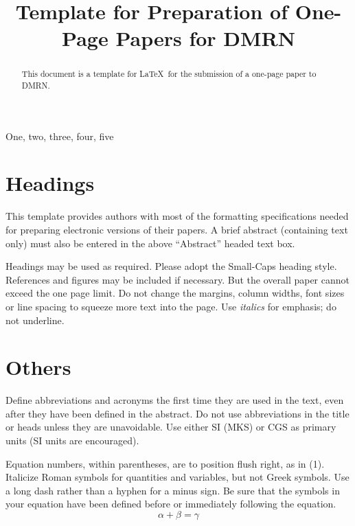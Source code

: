 \documentclass{article}
\title{Template for Preparation of One-Page Papers for DMRN}
\begin{document}
\tenpt
\maketitle

\begin{sloppy}
\begin{abstract}
This document is a template for \LaTeX\ for the submission of a one-page paper to DMRN. 
\end{abstract}

\begin{keywords}
One, two, three, four, five
\end{keywords}

\section{Headings}
\label{sec:headings}
This template provides authors with most of the formatting specifications needed for preparing electronic versions of their papers. A brief abstract (containing text only) must also be entered in the above ``Abstract'' headed text box.

Headings may be used as required. Please adopt the Small-Caps heading style. References and figures may be included if necessary. But the overall paper cannot exceed the one page limit. Do not change the margins, column widths, font sizes or line spacing to squeeze more text into the page. Use \textit{italics} for emphasis; do not underline. 

\section{Others}
\label{sec:others}
Define abbreviations and acronyms the first time they are used in the text, even after they have been defined in the abstract. Do not use abbreviations in the title or heads unless they are unavoidable. Use either SI (MKS) or CGS as primary units (SI units are encouraged).

Equation numbers, within parentheses, are to position flush right, as in (1). Italicize Roman symbols for quantities and variables, but not Greek symbols. Use a long dash rather than a hyphen for a minus sign. Be sure that the symbols in your equation have been defined before or immediately following the equation.
\begin{equation}
\alpha + \beta = \gamma
\end{equation}


\end{sloppy}
\end{document}
